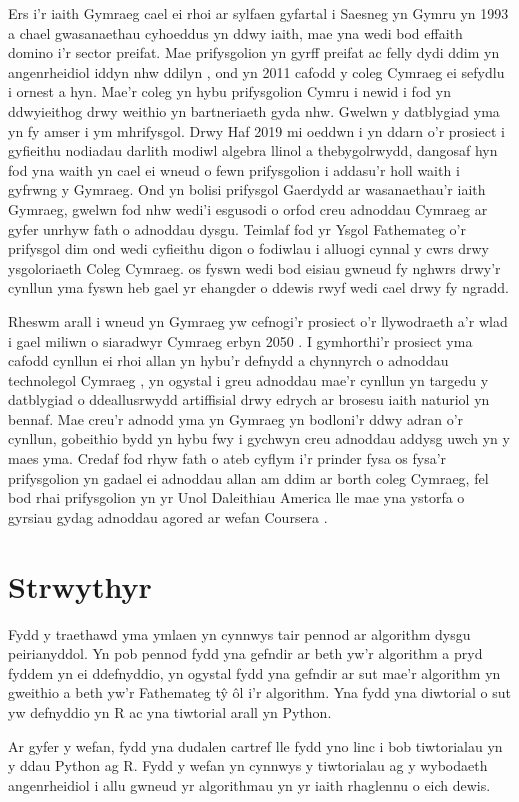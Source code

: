 Ers i'r iaith Gymraeg cael ei rhoi ar sylfaen gyfartal i Saesneg yn Gymru yn 1993 a chael gwasanaethau cyhoeddus yn ddwy iaith, mae yna wedi bod effaith domino i'r sector preifat. Mae prifysgolion yn gyrff preifat ac felly dydi ddim yn angenrheidiol iddyn nhw ddilyn \cite{prifysgolion}, ond yn 2011 cafodd y coleg Cymraeg ei sefydlu i ornest a hyn. Mae'r coleg yn hybu prifysgolion Cymru i newid i fod yn ddwyieithog drwy weithio yn bartneriaeth gyda nhw. Gwelwn y datblygiad yma yn fy amser i ym mhrifysgol. Drwy Haf 2019 mi oeddwn i yn ddarn o'r prosiect i gyfieithu nodiadau darlith modiwl algebra llinol a thebygolrwydd, dangosaf hyn fod yna waith yn cael ei wneud o fewn prifysgolion i addasu'r holl waith i gyfrwng y Gymraeg. Ond yn bolisi prifysgol Gaerdydd ar wasanaethau'r iaith Gymraeg, gwelwn fod nhw wedi'i esgusodi o orfod creu adnoddau Cymraeg ar gyfer unrhyw fath o adnoddau dysgu\cite{gwasanaethiaith}. Teimlaf fod yr Ysgol Fathemateg o'r prifysgol dim ond wedi cyfieithu digon o fodiwlau i alluogi cynnal y cwrs drwy ysgoloriaeth Coleg Cymraeg. os fyswn wedi bod eisiau gwneud fy nghwrs drwy'r cynllun yma fyswn heb gael yr ehangder o ddewis rwyf wedi cael drwy fy ngradd.

Rheswm arall i wneud yn Gymraeg yw cefnogi'r prosiect o'r llywodraeth a'r wlad i gael miliwn o siaradwyr Cymraeg erbyn 2050 \cite{cymraeg2050}. I gymhorthi'r prosiect yma cafodd cynllun ei rhoi allan yn hybu'r defnydd a chynnyrch o adnoddau technolegol Cymraeg \cite{cymraeg2050tech}, yn ogystal i greu adnoddau mae'r cynllun yn targedu y datblygiad o ddeallusrwydd artiffisial drwy edrych ar brosesu iaith naturiol yn bennaf. Mae creu'r adnodd yma yn Gymraeg yn bodloni'r ddwy adran o'r cynllun, gobeithio bydd yn hybu fwy i gychwyn creu adnoddau addysg uwch yn y maes yma. Credaf fod rhyw fath o ateb cyflym i'r prinder fysa os fysa'r prifysgolion yn gadael ei adnoddau allan am ddim ar borth coleg Cymraeg, fel bod rhai prifysgolion yn yr Unol Daleithiau America lle mae yna ystorfa o gyrsiau gydag adnoddau agored ar wefan Coursera \cite{coursera}.

\section{Strwythyr}

Fydd y traethawd yma ymlaen yn cynnwys tair pennod ar algorithm dysgu peirianyddol. Yn pob pennod fydd yna gefndir ar beth yw'r algorithm a pryd fyddem yn ei ddefnyddio, yn ogystal fydd yna gefndir ar sut mae'r algorithm yn gweithio a beth yw'r Fathemateg t\^{y} \^{o}l i'r algorithm. Yna fydd yna diwtorial o sut yw defnyddio yn R ac yna tiwtorial arall yn Python.

Ar gyfer y wefan, fydd yna dudalen cartref lle fydd yno linc i bob tiwtorialau yn y ddau Python ag R. Fydd y wefan yn cynnwys y tiwtorialau ag y wybodaeth angenrheidiol i allu gwneud yr algorithmau yn yr iaith rhaglennu o eich dewis.

